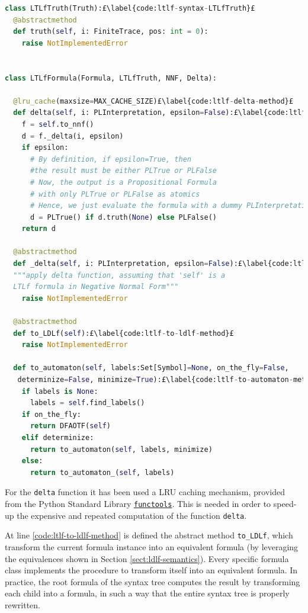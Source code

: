 \begin{lstlisting}[language=Python, style=Python,  escapechar = £, label={code:ltlf-syntax-LTLfFormula}, caption={The \texttt{LTLfFormula} abstraction (\href{https://github.com/MarcoFavorito/flloat/blob/0.1.4/flloat/syntax/ltlf.py}{flloat/syntax/ltlf.py)}}]
class LTLfTruth(Truth):£\label{code:ltlf-syntax-LTLfTruth}£
  @abstractmethod
  def truth(self, i: FiniteTrace, pos: int = 0):
    raise NotImplementedError


class LTLfFormula(Formula, LTLfTruth, NNF, Delta):

  @lru_cache(maxsize=MAX_CACHE_SIZE)£\label{code:ltlf-delta-method}£
  def delta(self, i: PLInterpretation, epsilon=False):£\label{code:ltlf-delta-method}£
    f = self.to_nnf()
    d = f._delta(i, epsilon)
    if epsilon:
      # By definition, if epsilon=True, then 
      #the result must be either PLTrue or PLFalse
      # Now, the output is a Propositional Formula
      # with only PLTrue or PLFalse as atomics
      # Hence, we just evaluate the formula with a dummy PLInterpretation
      d = PLTrue() if d.truth(None) else PLFalse()
    return d

  @abstractmethod
  def _delta(self, i: PLInterpretation, epsilon=False):£\label{code:ltlf-_delta-method}£
  """apply delta function, assuming that 'self' is a 
  LTLf formula in Negative Normal Form"""
    raise NotImplementedError

  @abstractmethod
  def to_LDLf(self):£\label{code:ltlf-to-ldlf-method}£
    raise NotImplementedError

  def to_automaton(self, labels:Set[Symbol]=None, on_the_fly=False,
   determinize=False, minimize=True):£\label{code:ltlf-to-automaton-method}£
    if labels is None:
      labels = self.find_labels()
    if on_the_fly:
      return DFAOTF(self)
    elif determinize:
      return to_automaton(self, labels, minimize)
    else:
      return to_automaton_(self, labels)
\end{lstlisting}
For the \texttt{delta} function it has been used a LRU caching mechanism, provided from the Python Standard Library \href{https://docs.python.org/3/library/functools.html}{\texttt{functools}}. This is needed in order to speed-up the expensive and repeated computation of the function \texttt{delta}.

At line \ref{code:ltlf-to-ldlf-method} is defined the abstract method \texttt{to\_LDLf}, which transform the current \LTLf formula instance into an \LDLf equivalent formula (by leveraging the equivalences shown in Section \ref{sect:ldlf-semantics}). Every specific \LTLf formula class implements the procedure to transform itself into an equivalent \LDLf formula. In practice, the root formula of the \LTLf syntax tree computes the result by transforming each child into a \LDLf formula, in such a way that the entire syntax tree is properly rewritten.

